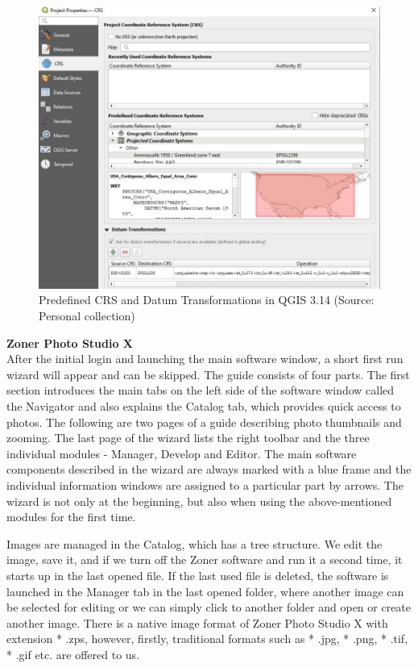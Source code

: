 \documentclass[a4paper,10pt,twoside]{article}
\begin{document}
\begin{figure}[hbt!] 
\begin{center}
\includegraphics[width=14cm]{../pictures/qgis_trans.JPG} 
\caption[Predefined CRS and Datum Transformations in QGIS 3.14]{Predefined CRS and Datum Transformations in QGIS 3.14 (Source: Personal collection)}
\label{fig:qgis_trans}
\end{center}
\end{figure}


\newpage
\noindent \textbf{Zoner Photo Studio X} \\

\noindent After the initial login and launching the main software window, a short first run wizard will appear and can be skipped. The guide consists of four parts. The first section introduces the main tabs on the left side of the software window called the Navigator and also explains the Catalog tab, which provides quick access to photos. The following are two pages of a guide describing photo thumbnails and zooming. The last page of the wizard lists the right toolbar and the three individual modules - Manager, Develop and Editor. The main software components described in the wizard are always marked with a blue frame and the individual information windows are assigned to a particular part by arrows. The wizard is not only at the beginning, but also when using the above-mentioned modules for the first time.

Images are managed in the Catalog, which has a tree structure. We edit the image, save it, and if we turn off the Zoner software and run it a second time, it starts up in the last opened file. If the last used file is deleted, the software is launched in the Manager tab in the last opened folder, where another image can be selected for editing or we can simply click to another folder and open or create another image. There is a native image format of Zoner Photo Studio X with extension * .zps, however, firstly, traditional formats such as * .jpg, * .png, * .tif, * .gif etc. are offered to us.
\end{document}
